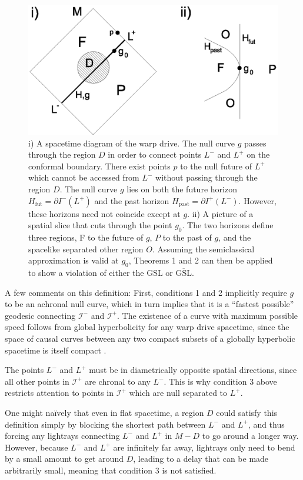 \documentclass[12pt]{article}
\begin{document}
\begin{figure}[ht]
\centering
\includegraphics[width=.9\textwidth]{warp2.eps}
\caption{\small{
i) A spacetime diagram of the warp drive.  The null curve $g$ passes through the region $D$ in order to connect points $L^-$ and $L^+$ on the conformal boundary.  There exist points $p$ to the null future of $L^+$ which cannot be accessed from $L^-$ without passing through the region $D$.  The null curve $g$ lies on both the future horizon $H_\mathrm{fut} = \partial I^-(L^+)$ and the  past horizon $H_\mathrm{past} = \partial I^+(L^-)$.  However, these horizons need not coincide except at $g$.  ii) A picture of a spatial slice that cuts through the point $g_0$.  The two horizons define three regions, F to the future of $g$, $P$ to the past of $g$, and the spacelike separated other region $O$.  Assuming the semiclassical approximation is valid at $g_0$, Theorems 1 and 2 can then be applied to show a violation of either the GSL or $\overline{\mathrm{GSL}}$.
}}\label{warp2}
\end{figure}

A few comments on this definition: First, conditions 1 and 2 implicitly require $g$ to be an achronal null curve, which in turn implies that it is a ``fastest possible'' geodesic connecting $\mathcal{I}^-$ and $\mathcal{I}^+$.  The existence of a curve with maximum possible speed follows from global hyperbolicity for any warp drive spacetime, since the space of causal curves between any two compact subsets of a globally hyperbolic spacetime is itself compact \cite{SW96}.  

The points $L^-$ and $L^+$ must be in diametrically opposite spatial directions, since all other points in $\mathcal{I}^+$ are chronal to any $L^-$.  This is why condition 3 above restricts attention to points in $\mathcal{I}^+$ which are null separated to $L^+$.

One might na\"{i}vely that even in flat spacetime, a region $D$ could satisfy this definition simply by blocking the shortest path between $L^-$ and $L^+$, and thus forcing any lightrays connecting $L^-$ and $L^+$ in $M - D$ to go around a longer way.  However, because $L^-$ and $L^+$ are infinitely far away, lightrays only need to bend by a small amount to get around $D$, leading to a delay that can be made arbitrarily small, meaning that condition 3 is not satisfied.
\end{document}
